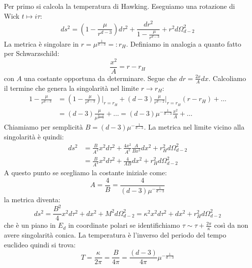 Per primo si calcola la temperatura di Hawking. Eseguiamo una rotazione di Wick $t \mapsto i\tau$:
\begin{equation*}
    ds^2 = \left( 1 - \frac{\mu}{r^{d-3}}\right) d\tau^2 + \frac{dr^2}{1 - \frac{\mu}{r^{d-3}}} + r^2d\Omega_{d-2}^2
\end{equation*}
La metrica è singolare in $r = \mu^{\frac{1}{d-3}} =: r_H$. Definiamo in analogia a quanto fatto per Schwarzschild:
\begin{equation*}
    \frac{x^2}{A} = r - r_H
\end{equation*}
con $A$ una costante opportuna da determinare. Segue che $dr = \frac{2x}{A}dx$.
Calcoliamo il termine che genera la singolarità nel limite $r \rightarrow r_H$:
\begin{align*}
    1 - \frac{\mu}{r^{d-3}} &= \left( 1 - \frac{\mu}{r^{d-3}}\right)\Big|_{r=r_H} + (d-3)\frac{\mu}{r^{d-2}}\Big|_{r=r_H}(r-r_H) + \dots \\
    &= (d-3)\frac{\mu}{\mu^{\frac{d-2}{d-3}}} + \dots= (d-3)\mu^{- \frac{1}{d-3}}\frac{x^2}{A} + \dots
\end{align*}
Chiamiamo per semplicità $B= (d-3)\mu^{- \frac{1}{d-3}} $. La metrica nel limite vicino alla singolarità è quindi:
\begin{align*}
    ds^2 &= \frac{B}{A^2}x^2d\tau^2 + \frac{4x^2}{A^2}\frac{A}{Bx^2}dx^2 + r_H^2d\Omega_{d-2}^2 \\
    &=\frac{B}{A^2}x^2d\tau^2 + \frac{4}{AB}dx^2 + r_H^2d\Omega_{d-2}^2
\end{align*}
A questo punto se scegliamo la costante iniziale come:
\begin{equation*}
    A = \frac{4}{B} = \frac{4}{(d-3)\mu^{-\frac{1}{d-3}}}
\end{equation*}
la metrica diventa:
\begin{equation*}
    ds^2 = \frac{B^2}{4}x^2d\tau^2 + dx^2 + M^2d\Omega_{d-2}^2 = \kappa^2 x^2 d\tau^2 + dx^2 + r_H^2d\Omega_{d-2}^2
\end{equation*}
che è un piano in $E_d$ in coordinate polari se identifichiamo $\tau \sim \tau + \frac{2\pi}{\kappa}$ così da non avere singolarità conica.  La temperatura è l'inverso del periodo del tempo euclideo quindi si trova:
\begin{equation}
    T = \frac{\kappa}{2\pi} = \frac{B}{4\pi} = \frac{(d-3)}{4\pi}\mu^{-\frac{1}{d-3}}
    \label{eq.temp_schwarz_tangherlini}
\end{equation}

